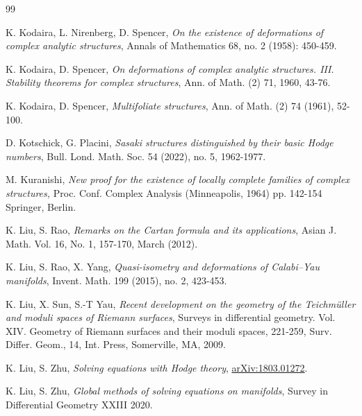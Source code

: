 \documentclass[12pt]{amsart}
\numberwithin{equation}{section}
\theoremstyle{definition}
\theoremstyle{definition}
\theoremstyle{definition}
\renewcommand{\1}{\mathsf{1}}
\renewcommand{\>}{\rightarrow}
\theoremstyle{plain} %
\theoremstyle{plain} %
\theoremstyle{plain} %
\begin{document}
\begin{thebibliography}{99}
		
		
		 K. Kodaira, L. Nirenberg, D. Spencer,  \newblock \textit{On the existence of deformations of complex analytic structures}, \newblock Annals of Mathematics 68, no. 2 (1958): 450-459.
		
		 K. Kodaira, D. Spencer,
		\newblock \textit{On deformations of complex analytic structures. III. Stability
			theorems for complex structures},
		\newblock Ann. of Math. (2) {71}, 1960, 43-76.
		
		K. Kodaira, D. Spencer,
		\newblock \textit{Multifoliate structures},
		\newblock Ann. of Math. (2) 74 (1961), 52-100.
		
		
		 D. Kotschick, G. Placini,  \textit{Sasaki structures distinguished by their basic Hodge numbers}, Bull. Lond. Math. Soc. 54 (2022), no. 5, 1962-1977.
		
		 M. Kuranishi,
		\newblock \textit{New proof for the existence of locally complete families of complex structures,}
		 Proc. Conf. Complex Analysis (Minneapolis, 1964) pp. 142-154 Springer, Berlin.
		
		
		
		
		
		 K. Liu, S. Rao,
		\newblock \textit{Remarks on the Cartan formula and its applications},
		\newblock Asian J. Math. Vol. 16, No. 1, 157-170, March (2012).
		
		 K. Liu, S. Rao, X. Yang,
		\newblock\textit{Quasi-isometry and deformations of Calabi--Yau manifolds},
		\newblock Invent. Math. 199 (2015), no. 2, 423-453.
		
		 K. Liu, X. Sun, S.-T Yau,
		\newblock \textit{Recent development on the geometry of
			the Teichm\"{u}ller and moduli spaces of Riemann surfaces},
		\newblock Surveys in differential geometry. Vol. XIV. Geometry of Riemann surfaces and their moduli spaces, 221-259,
		Surv. Differ. Geom., 14, Int. Press, Somerville, MA, 2009.
		
		 K. Liu, S. Zhu, \newblock \textit{Solving equations with Hodge theory}, \href{https://arxiv.org/abs/1803.01272}{arXiv:1803.01272}.
		
		 K. Liu, S. Zhu, \newblock \textit{Global methods of solving equations on manifolds}, \newblock Survey in Differential
		Geometry XXIII 2020.
		
		
		

\end{thebibliography}
\end{document}
